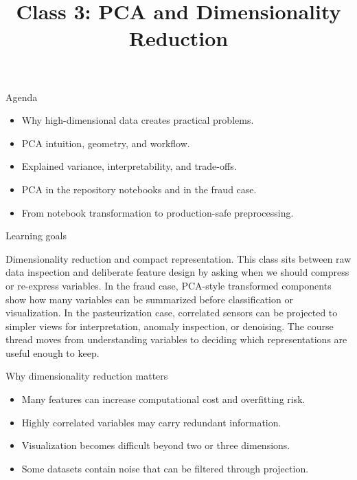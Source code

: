 

\title{Class 3: PCA and Dimensionality Reduction}
\author{\coursename}
\date{}



\frame{\titlepage \coursefooter}

\begin{frame}{Agenda}
\begin{itemize}
\item Why high-dimensional data creates practical problems.
\item PCA intuition, geometry, and workflow.
\item Explained variance, interpretability, and trade-offs.
\item PCA in the repository notebooks and in the fraud case.
\item From notebook transformation to production-safe preprocessing.
\end{itemize}
\coursefooter
\end{frame}

\begin{frame}{Learning goals}
\coursefooter
\end{frame}

\coursecontextframe
{Dimensionality reduction and compact representation.}
{This class sits between raw data inspection and deliberate feature design by asking when we should compress or re-express variables.}
{In the fraud case, PCA-style transformed components show how many variables can be summarized before classification or visualization.}
{In the pasteurization case, correlated sensors can be projected to simpler views for interpretation, anomaly inspection, or denoising.}
{The course thread moves from understanding variables to deciding which representations are useful enough to keep.}

\begin{frame}{Why dimensionality reduction matters}
\begin{itemize}
\item Many features can increase computational cost and overfitting risk.
\item Highly correlated variables may carry redundant information.
\item Visualization becomes difficult beyond two or three dimensions.
\item Some datasets contain noise that can be filtered through projection.
\end{itemize}
\coursefooter
\end{frame}

